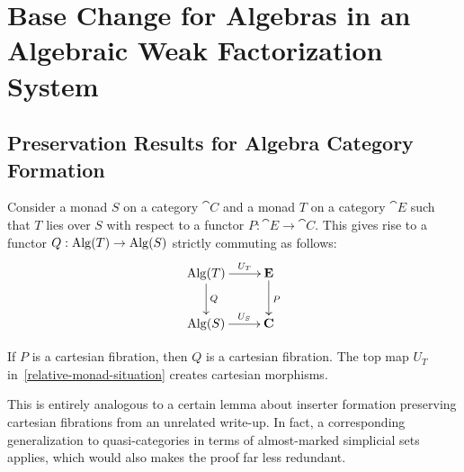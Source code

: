 \documentclass[reqno,10pt,a4paper,oneside]{amsart}
\begin{document}
\section{Base Change for Algebras in an Algebraic Weak Factorization System}

\subsection{Preservation Results for Algebra Category Formation}

Consider a monad $S$ on a category $\cat{C}$ and a monad $T$ on a category $\cat{E}$ such that $T$ lies over $S$ with respect to a functor $P : \cat{E} \to \cat{C}$.
This gives rise to a functor $Q : \operatorname{Alg}(T) \to \operatorname{Alg}(S)$ strictly commuting as follows:
\begin{equation}
\label{relative-monad-situation}
\begin{gathered}
\xymatrix{
  \Alg(T)
  \ar[r]^-{U_T}
  \ar[d]^{Q}
&
  \cat{E}
  \ar[d]^{P}
\\
  \Alg(S)
  \ar[r]^-{U_S}
&
  \cat{C}
}
\end{gathered}
\end{equation}

\begin{lemma}
\label{Alg-preserves-cartesian-fib}
If $P$ is a cartesian fibration, then $Q$ is a cartesian fibration.
The top map $U_T$ in~\eqref{relative-monad-situation} creates cartesian morphisms.
\end{lemma}

\begin{remark}
This is entirely analogous to a certain lemma about inserter formation preserving cartesian fibrations from an unrelated write-up.
In fact, a corresponding generalization to quasi-categories in terms of almost-marked simplicial sets applies, which would also makes the proof far less redundant.
\end{remark}
\end{document}
